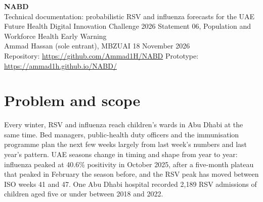 \documentclass[11pt,a4paper]{article}
\begin{document}
\begin{flushleft}
{\Huge\bfseries NABD}\\[0.3em]
{\Large Technical documentation: probabilistic RSV and influenza forecasts for the UAE}\\[0.8em]
{\small Future Health Digital Innovation Challenge 2026 \textperiodcentered{} Statement 06, Population and Workforce Health Early Warning\\
Ammad Hassan (sole entrant), MBZUAI \textperiodcentered{} 18 November 2026\\
Repository: \url{https://github.com/Ammad1H/NABD} \textperiodcentered{} Prototype: \url{https://ammad1h.github.io/NABD/}}
\end{flushleft}

\begin{abstract}
\noindent NABD forecasts the weekly share of laboratory samples that test positive for RSV and for influenza in the United Arab Emirates, three weeks ahead, as probabilistic ranges rather than single numbers. Each forecast is turned into the chance of crossing a pressure threshold and into one proposed action for a named role, which a person approves, modifies or dismisses. The UAE's public surveillance record is only four seasons long, which is too short for a model built on it alone to beat the simple rule of repeating last week. NABD therefore trains one model on the WHO surveillance histories of many countries and applies it to a country that brings only its recent weeks. On eighteen countries that were held out under a pre-registered plan, this pooled model made 23\% less influenza forecast error than a model fitted to each country's own record. On the UAE's own two most recent seasons, forecast forward in time without the UAE in its training, it had less error than repeating last week in both (relative error 0.77); this is a development check, and a locked forward test will give the confirmatory UAE result. The work is a prototype on public data. No hospital has used it, and this document states what has and has not been shown.
\end{abstract}

\section{Problem and scope}

Every winter, RSV and influenza reach children's wards in Abu Dhabi at the same time. Bed managers, public-health duty officers and the immunisation programme plan the next few weeks largely from last week's numbers and last year's pattern. UAE seasons change in timing and shape from year to year: influenza peaked at 40.6\% positivity in October 2025, after a five-month plateau that peaked in February the season before, and the RSV peak has moved between ISO weeks 41 and 47. One Abu Dhabi hospital recorded 2,189 RSV admissions of children aged five or under between 2018 and 2022.
\end{document}
